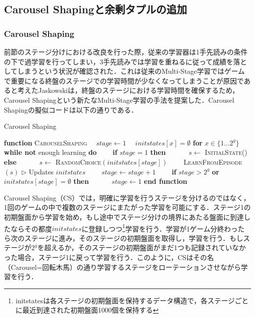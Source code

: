 \documentclass{suribt}
\begin{document}
\subsection{Carousel Shapingと余剰タプルの追加}
\subsubsection{Carousel Shaping}
前節のステージ分けにおける改良を行った際，従来の学習器は1手先読みの条件の下で過学習を行ってしまい，3手先読みでは学習を重ねるに従って成績を落としてしまうという状況が確認された．これは従来のMulti-Stage学習ではゲームで重要になる終盤のステージでの学習時間が少なくなってしまうことが原因であると考えたJaskowskiは，終盤のステージにおける学習時間を確保するため，Carousel Shapingという新たなMulti-Stage学習の手法を提案した．Carousel Shapingの擬似コードは以下の通りである．

\begin{algorithm}
\caption{Carousel Shaping}
\label{alg1}
\begin{algorithmic}[1]
\STATE \textbf{function} \textsc{CarouselShaping}
\STATE 　$stage \leftarrow 1$
\STATE 　$initstates[x] = \emptyset$ \textbf{for} $x \in \{1...2^g\}$
\STATE 　\textbf{while not} enough learning \textbf{do}
\STATE 　　\textbf{if} $stage = 1$ \textbf{then}
\STATE 　　　$s \leftarrow$ \textsc{InitialState()}
\STATE 　　\textbf{else}
\STATE 　　　$s \leftarrow$ \textsc{RandomChoice}$(initstates[stage])$
\STATE 　　\textsc{LearnFromEpisode}$(s)$ $\triangleright$ Updates $initstates$
\STATE 　　$stage \leftarrow stage + 1$
\STATE 　　\textbf{if} $stage > 2^g$ \textbf{or} $initstates[stage] = \emptyset$ \textbf{then}
\STATE 　　　$stage \leftarrow 1$
\STATE \textbf{end function}
\end{algorithmic}
\end{algorithm}

Carousel Shaping（CS）では，明確に学習を行うステージを分けるのではなく，1回のゲームの中で複数のステージにまたがった学習を可能にする．ステージ1の初期盤面から学習を始め，もし途中でステージ分けの境界にあたる盤面に到達したならその都度$initstates$に登録しつつ\footnote{initstatesは各ステージの初期盤面を保持するデータ構造で，各ステージごとに最近到達された初期盤面1000個を保持する}学習を行う．学習が1ゲーム分終わったら次のステージに進み，そのステージの初期盤面を取得し，学習を行う．もしステージが$2^g$を超えるか，そのステージの初期盤面がまだ1つも記録されていなかった場合，ステージ1に戻って学習を行う．このように，CSはその名（Carousel=回転木馬）の通り学習するステージをローテーションさせながら学習を行う．
\end{document}

